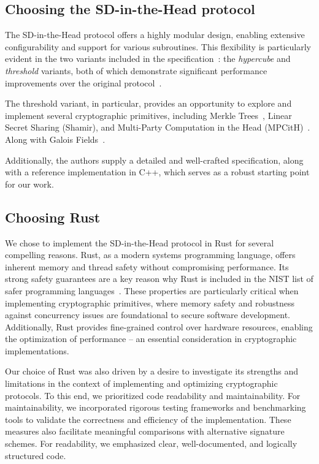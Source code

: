 \documentclass[twoside,11pt]{report}
\theoremstyle{definition}
\theoremstyle{plain}
\begin{document}
\subsection{Choosing the SD-in-the-Head protocol}
The SD-in-the-Head protocol offers a highly modular design, enabling extensive configurability and support for various subroutines. This flexibility is particularly evident in the two variants included in the specification~\cite{aguilarsyndrome11}: the \textit{hypercube} and \textit{threshold} variants, both of which demonstrate significant performance improvements over the original protocol~\cite{feneuil2022syndrome,aguilar2023return,feneuil2023threshold}.

The threshold variant, in particular, provides an opportunity to explore and implement several cryptographic primitives, including Merkle Trees~\cite{becker2008merkle}, Linear Secret Sharing (Shamir), and Multi-Party Computation in the Head (MPCitH)~\cite{baum2020concretely}. Along with Galois Fields~\cite{brownadvanced}.

Additionally, the authors supply a detailed and well-crafted specification, along with a reference implementation in C++, which serves as a robust starting point for our work.


\subsection{Choosing Rust}
We chose to implement the SD-in-the-Head protocol in Rust for several compelling reasons. Rust, as a modern systems programming language, offers inherent memory and thread safety without compromising performance. Its strong safety guarantees are a key reason why Rust is included in the NIST list of safer programming languages~\cite{nistsaferlanguages}. These properties are particularly critical when implementing cryptographic primitives, where memory safety and robustness against concurrency issues are foundational to secure software development. Additionally, Rust provides fine-grained control over hardware resources, enabling the optimization of performance -- an essential consideration in cryptographic implementations.

Our choice of Rust was also driven by a desire to investigate its strengths and limitations in the context of implementing and optimizing cryptographic protocols. To this end, we prioritized code readability and maintainability. For maintainability, we incorporated rigorous testing frameworks and benchmarking tools to validate the correctness and efficiency of the implementation. These measures also facilitate meaningful comparisons with alternative signature schemes. For readability, we emphasized clear, well-documented, and logically structured code.
\end{document}
